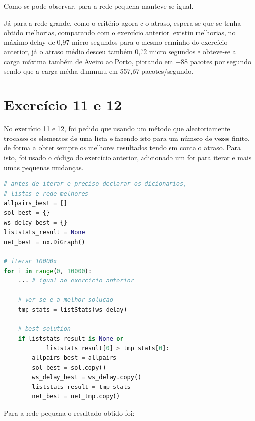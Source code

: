 \documentclass[pdftex,12pt,a4paper]{report}
\begin{document}


Como se pode observar, para a rede pequena manteve-se igual.

Já para a rede grande, como o critério agora é o atraso, espera-se que se tenha obtido melhorias, comparando com o exercício anterior, existiu melhorias, no máximo delay de 0,97 micro segundos para o mesmo caminho do exercício anterior, já o atraso médio desceu também 0,72 micro segundos e obteve-se a carga máxima também de Aveiro ao Porto, piorando em +88 pacotes por segundo sendo que a carga média diminuiu em 557,67 pacotes/segundo.






\section{Exercício 11 e 12}

No exercício 11 e 12, foi pedido que usando um método que aleatoriamente trocasse os elementos de uma lista e fazendo isto para um número de vezes finito, de forma a obter sempre os melhores resultados tendo em conta o atraso. Para isto, foi usado o código do exercício anterior, adicionado um for para iterar e mais umas pequenas mudanças.

\begin{lstlisting}[language=python]
# antes de iterar e preciso declarar os dicionarios, 
# listas e rede melhores
allpairs_best = []
sol_best = {}
ws_delay_best = {}
liststats_result = None
net_best = nx.DiGraph()

# iterar 10000x
for i in range(0, 10000):
	... # igual ao exercicio anterior
	
	# ver se e a melhor solucao
	tmp_stats = listStats(ws_delay)

    # best solution
    if liststats_result is None or 
    		liststats_result[0] > tmp_stats[0]:
        allpairs_best = allpairs
        sol_best = sol.copy()
        ws_delay_best = ws_delay.copy()
        liststats_result = tmp_stats
        net_best = net_tmp.copy()
\end{lstlisting}

\newpage
Para a rede pequena o resultado obtido foi:
\end{document}
